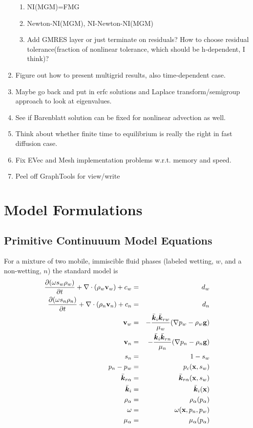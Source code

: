 \documentclass[10pt,dvips,twoside,reqno]{amsart}
\begin{document}
\begin{enumerate}
\begin{enumerate}
\item NI(MGM)=FMG
\item Newton-NI(MGM), NI-Newton-NI(MGM)
\item Add GMRES layer or just terminate on residuals? How to choose residual tolerance(fraction of nonlinear tolerance, which should be h-dependent, I think)?
\end{enumerate}
\item Figure out how to present multigrid results, also time-dependent case.
\item Maybe go back and put in erfc solutions and Laplace transform/semigroup approach to look at eigenvalues.
\item See if Barenblatt solution can be fixed for nonlinear advection as well.
\item Think about whether finite time to equilibrium is really the right in fast diffusion case.
\item Fix EVec and Mesh implementation problems w.r.t. memory and speed.
\item Peel off GraphTools for view/write
\end{enumerate}


\tableofcontents 

\section{Model Formulations}

\subsection{Primitive Continuuum Model Equations}

For a mixture of two mobile, immiscible fluid phases (labeled wetting,
$w$, and a non-wetting, $n$) the standard model is
\begin{eqnarray}
\frac{\partial {(\omega s_w \rho_w)}}{\partial {t}} + \nabla \cdot (\rho_w {\bf v}_w) +c_w&=& d_w \label{eq:satW} \\
\frac{\partial {(\omega s_n \rho_n)}}{\partial {t}} + \nabla \cdot (\rho_n {\bf v}_n) +c_n&=& d_n \label{eq:satN}\\
{\bf v}_w &=& - \frac{\bar{\mbox{{\boldmath ${k}$}}}_i \bar{\mbox{{\boldmath ${k}$}}}_{rw}}{\mu_w}(\nabla p_w - \rho_w {\bf g})  \label{eq:waterFlux} \\
{\bf v}_n &=& - \frac{\bar{\mbox{{\boldmath ${k}$}}}_i \bar{\mbox{{\boldmath ${k}$}}}_{rn}}{\mu_n}(\nabla p_n - \rho_n {\bf g})  \label{eq:nwFlux}\\
s_n &=& 1 - s_w \label{eq:sat_const} \\
p_n - p_w &=& p_c({\bf x},s_w) \label{eq:pc_S} \\
\bar{\mbox{{\boldmath ${k}$}}}_{r \alpha} &=& \bar{\mbox{{\boldmath ${k}$}}}_{r \alpha}({\bf x},s_w) \label{eq:kr_S} \\
\bar{\mbox{{\boldmath ${k}$}}}_{i} &=& \bar{\mbox{{\boldmath ${k}$}}}_{i}({\bf x}) \\
\rho_{\alpha} &=& \rho_{\alpha}(p_{\alpha}) \\
\omega &=& \omega({\bf x},p_n,p_w) \\
\mu_{\alpha} &=& \mu_{\alpha}(p_{\alpha})
\label{eq:viscosity} 
\end{eqnarray}
\end{document}
